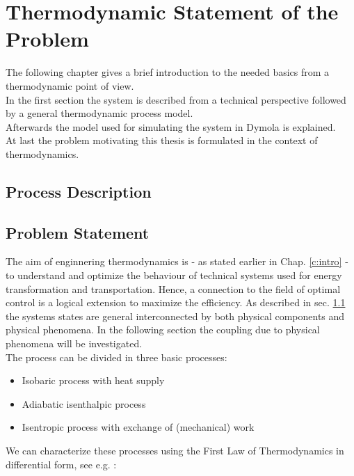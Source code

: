 \chapter{Thermodynamic Statement of the Problem}\label{c:thermo}

The following chapter gives a brief introduction to the needed basics from a thermodynamic point of view.\\

In the first section the system is described from a technical perspective followed by  a general thermodynamic process model. \\

Afterwards the model used for simulating the system in Dymola is explained. \\

At last the problem motivating this thesis is formulated in the context of thermodynamics.

\section{Process Description} \label{c:thermo:s:process}

\section{Problem Statement} \label{c:thermo:problem}
The aim of enginnering thermodynamics is - as stated earlier in Chap. \ref{c:intro} - to understand and optimize the  behaviour of technical systems used for energy transformation and transportation. Hence, a connection to the field of optimal control is a logical extension to maximize the efficiency. As described in sec. \ref{c:thermo:s:process} the systems states are general interconnected by both physical components and physical phenomena. In the following section the coupling due to physical phenomena will be investigated.\\

The process can be divided in three basic processes:
\begin{itemize}
\item Isobaric process with heat supply
\item Adiabatic isenthalpic process 
\item Isentropic process with exchange of (mechanical) work
\end{itemize}
We can characterize these processes using the First Law of Thermodynamics in differential form, see e.g. \cite[p.25]{Weigand2013}:

